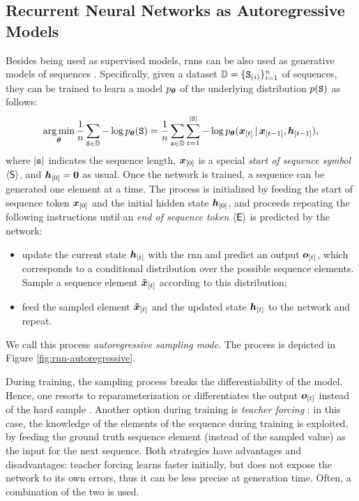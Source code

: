\subsection{Recurrent Neural Networks as Autoregressive Models}
Besides being used as supervised models, \glspl{rnn} can be also used as generative models of sequences \cite{graves2013generating}. Specifically, given a dataset $\Data = \{\PatternGraph{S}{i}\}_{i=1}^n$ of sequences, they can be trained to learn a model $p_{\boldsymbol{\theta}}$ of the underlying distribution $p(\AttrGraph{s})$ as follows:
$$\argmin_{\Param} \frac{1}{n} \sum_{\AttrGraph{s} \in \Data} - \log p_{\Param}(\AttrGraph{s}) = \frac{1}{n} \sum_{\Seq{s} \in \Data} \sum_{t=1}^{|\AttrGraph{s}|} - \log p_{\Param}(\Elem{x}{t} \given \Elem{x}{t-1}, \Elem{h}{t-1}),$$
where $|\mathtt{s}|$ indicates the sequence length, $\Elem{x}{0}$ is a special \emph{start of sequence symbol} $\mathsf{\langle S \rangle}$, and $\Elem{h}{0} = \Zeros$ as usual. Once the network is trained, a sequence can be generated one element at a time. The process is initialized by feeding the start of sequence token $\Elem{x}{0}$ and the initial hidden state $\Elem{h}{0}$, and proceeds repeating the following instructions until an \emph{end of sequence token} $\langle \mathsf{E} \rangle$ is predicted by the network:
\begin{itemize}
    \item update the current state $\Elem{h}{t}$ with the \gls{rnn} and predict an output $\Elem{o}{t}$, which corresponds to a conditional distribution over the possible sequence elements. Sample a sequence element $\Elem{\tilde{x}}{t}$ according to this distribution;
    \item feed the sampled element $\Elem{\tilde{x}}{t}$ and the updated state $\Elem{h}{t}$ to the network and repeat.
\end{itemize}
We call this process \emph{autoregressive sampling mode}. The process is depicted in Figure \ref{fig:rnn-autoregressive}.
\begin{figure*}[h!]
    \centering
    \resizebox{.7\textwidth}{!}{}
    \caption{An example of training a recurrent neural network for learning an autoregressive distribution. The dashed arrows indicate non-differentiable operations.}
    \label{fig:rnn-autoregressive}
\end{figure*}
During training, the sampling process breaks the differentiability of the model. Hence, one resorts to reparameterization \citep{jang2017gumbel} or differentiates the output $\Elem{o}{t}$ instead of the hard sample \citep{bengio2013straighttrough}. Another option during training is \emph{teacher forcing} \citep{williams1989teacherforcing}: in this case, the knowledge of the elements of the sequence during training is exploited, by feeding the ground truth sequence element (instead of the sampled value) as the input for the next sequence. Both strategies have advantages and disadvantages: teacher forcing learns faster initially, but does not expose the network to its own errors, thus it can be less precise at generation time. Often, a combination of the two is used.
